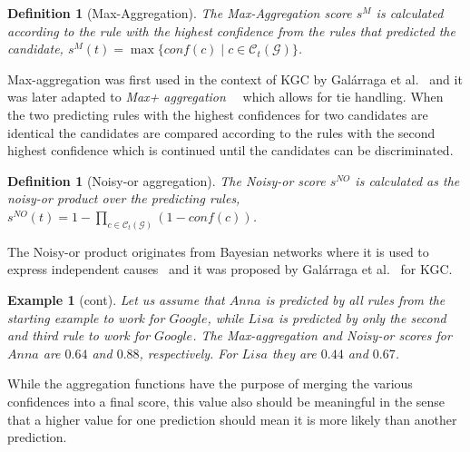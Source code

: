 \documentclass{article}
\theoremstyle{plain}
\newtheorem{definition}[theorem]{Definition}
\newtheorem{example}[theorem]{Example}
\theoremstyle{remark}
\newcommand{\atomrule}{c}
\newcommand{\triple}{t}
\newcommand{\alltriples}{\mathcal{G}}
\newcommand{\tFiredAtomRulesG}{\mathcal{C}_\triple(\alltriples)}
\begin{document}
\begin{definition}[Max-Aggregation]
The Max-Aggregation score $s^{M}$ is calculated according to the rule with the highest confidence from the rules that predicted the candidate, $s^{M}(t) = \max \{\textit{conf}(\atomrule) \;|\; \atomrule \in \tFiredAtomRulesG  \} $.
\end{definition}

\noindent Max-aggregation was first used in the context of KGC by Gal\'{a}rraga et al.~ and it was later adapted to \textit{Max+ aggregation}~~\cite{meilicke2019anyburl} which allows for tie handling. When the two predicting rules with the highest confidences for two candidates are identical the candidates are compared according to the rules with the second highest confidence which is continued until the candidates can be discriminated. 

\begin{definition}[Noisy-or aggregation]
The Noisy-or score $s^{NO}$ is calculated as the noisy-or product over the predicting rules,  $s^{NO}(t) = 1 - \prod_{\atomrule \in\tFiredAtomRulesG } (1- conf(\atomrule))$.
\end{definition}

\noindent The Noisy-or product originates from Bayesian networks where it is used to express independent causes~\cite{pearl1988probabilistic} and it was proposed by Gal\'{a}rraga et al.~ for KGC.


\begin{example}[cont] \label{ex:aggregation example}
Let us assume that $Anna$ is predicted by all rules from the starting example to work for $Google$,  while $Lisa$ is predicted by only the second and third rule to work for $Google$. The Max-aggregation and Noisy-or scores for $Anna$ are $0.64$ and $0.88$, respectively. For $Lisa$ they are $0.44$ and $0.67$. 
\end{example}

While the aggregation functions have the purpose of merging the various confidences into a final score, this value also should be meaningful in the sense that a higher value for one prediction should mean it is more likely than another prediction. 


\end{document}
